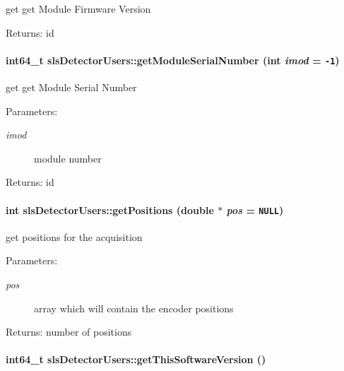 get get Module Firmware Version \begin{Desc}
\item[Returns:]id \end{Desc}
\hypertarget{classslsDetectorUsers_5c0e9f8836e1a8a2d986408e4f5dfd3b}{
\paragraph[getModuleSerialNumber]{\setlength{\rightskip}{0pt plus 5cm}int64\_\-t sls\-Detector\-Users::get\-Module\-Serial\-Number (int {\em imod} = {\tt -1})}\hfill}
\label{classslsDetectorUsers_5c0e9f8836e1a8a2d986408e4f5dfd3b}


get get Module Serial Number \begin{Desc}
\item[Parameters:]
\begin{description}
\item[{\em imod}]module number \end{description}
\end{Desc}
\begin{Desc}
\item[Returns:]id \end{Desc}
\hypertarget{classslsDetectorUsers_e6e5f06995e3ef110824adc5f8b095e9}{
\paragraph[getPositions]{\setlength{\rightskip}{0pt plus 5cm}int sls\-Detector\-Users::get\-Positions (double $\ast$ {\em pos} = {\tt NULL})}\hfill}
\label{classslsDetectorUsers_e6e5f06995e3ef110824adc5f8b095e9}


get positions for the acquisition 

\begin{Desc}
\item[Parameters:]
\begin{description}
\item[{\em pos}]array which will contain the encoder positions \end{description}
\end{Desc}
\begin{Desc}
\item[Returns:]number of positions \end{Desc}
\hypertarget{classslsDetectorUsers_547feb09262a2f0fa1ec4de82e92ab63}{
\paragraph[getThisSoftwareVersion]{\setlength{\rightskip}{0pt plus 5cm}int64\_\-t sls\-Detector\-Users::get\-This\-Software\-Version ()}\hfill}
\label{classslsDetectorUsers_547feb09262a2f0fa1ec4de82e92ab63}


